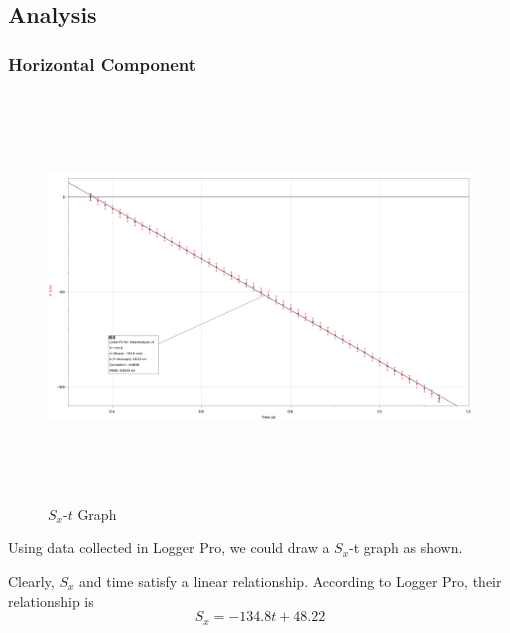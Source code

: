 \documentclass[12pt,a4paper]{article}
\begin{document}
\begin{spacing}{1.25}
\subsection{Analysis}
\subsubsection{Horizontal Component}
\begin{figure}[H]
    \centering
    \includegraphics[width=15.9cm, height=10.8cm]{Sx-t.png}
    \caption{\(S_x\)-$t$ Graph}
    \label{fig1}
\end{figure}
Using data collected in Logger Pro, we could draw a \(S_x\)-t graph as shown.\par
Clearly, \(S_x\) and time satisfy a linear relationship. According to Logger Pro, their relationship is
\[
    S_x = -134.8t + 48.22
\]

\end{spacing}
\end{document}
